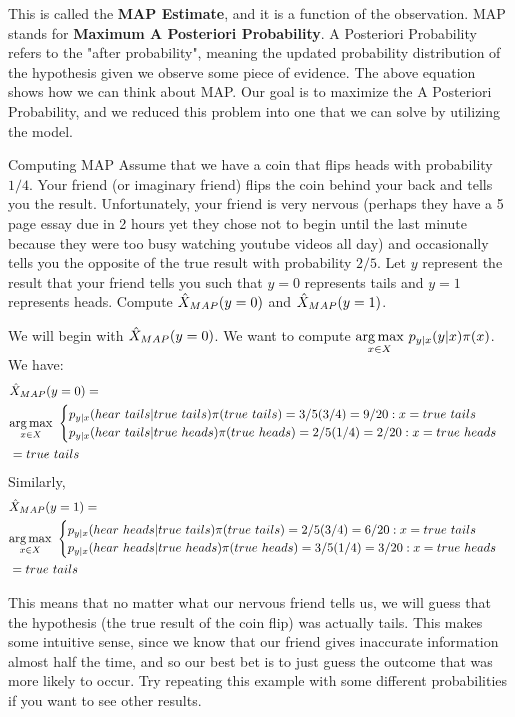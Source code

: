 This is called the \textbf{MAP Estimate}, and it is a function of the observation. MAP stands for \textbf{Maximum A Posteriori Probability}. A Posteriori Probability refers to the "after probability", meaning the 
updated probability distribution of the hypothesis given we observe some piece of evidence. The above equation shows how we can think about MAP. Our goal is to maximize the A Posteriori Probability, and we reduced this problem into one that we can solve by utilizing the model. \newline 

\begin{exmp}{Computing MAP}{}
Assume that we have a coin that flips heads with probability \(1/4\). Your friend (or imaginary friend) flips the coin behind your back and tells you the result. Unfortunately, your friend is very nervous (perhaps they have a 5 page essay due in 2 hours yet they chose not to begin until the last minute because they were too busy watching youtube videos all day) and occasionally tells you the opposite of the true result with probability \(2/5\). Let \(y\) represent the result that your friend tells you such that \(y=0\) represents tails and \(y=1\) represents heads. Compute \({\hat{X}_{MAP}} (y=0)\) and \({\hat{X}_{MAP}} (y=1)\). \newline 

We will begin with \({\hat{X}_{MAP}} (y=0)\). We want to compute \(\underset{x\in X}{\argmax}\ p_{y|x}(y|x)\pi(x)\). We have: 
\begin{align*}
  &\MAP (y=0) = \\
  &\underset{x\in X}{\argmax}\ 
\begin{cases}
	p_{y|x}(hear\ tails|true\ tails)\pi(true\ tails) = 3/5(3/4)=9/20:x=true \ tails \\
	p_{y|x}(hear\ tails|true\ heads)\pi(true\ heads) = 2/5(1/4) = 2/20:x=true\ heads
\end{cases} 
\\
&= true \ tails
\end{align*}
Similarly,
\begin{align*}
  &\MAP (y=1) = \\
  &\underset{x\in X}{\argmax}\ 
\begin{cases}
	p_{y|x}(hear\ heads|true\ tails)\pi(true\ tails) = 2/5(3/4)=6/20:x=true \ tails \\
	p_{y|x}(hear\ heads|true\ heads)\pi(true\ heads) = 3/5(1/4) = 3/20:x=true\ heads
\end{cases} 
\\
&= true \ tails
\end{align*}
\newline 

This means that no matter what our nervous friend tells us, we will guess that the hypothesis (the true result of the coin flip) was actually tails. This makes some intuitive sense, since we know that our friend gives inaccurate information almost half the time, and so our best bet is to just guess the outcome that was more likely to occur. Try repeating this example with some different probabilities if you want to see other results. 


\end{exmp}


